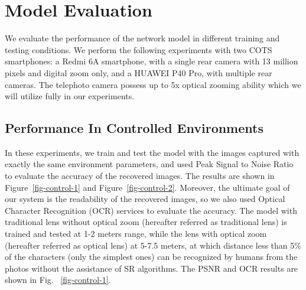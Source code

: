 \section{Model Evaluation}
\label{sec-evaluation}
We evaluate the performance of the network model in different training and testing conditions. We perform the following experiments with two COTS smartphones: a Redmi 6A smartphone, with a single rear camera with 13 million pixels and digital zoom only, and a HUAWEI P40 Pro, with multiple rear cameras. The telephoto camera possess up to 5x optical zooming ability which we will utilize fully in our experiments.
 
\subsection{Performance In Controlled Environments}
In these experiments, we train and test the model with the images captured with exactly the same environment parameters, and used Peak Signal to Noise Ratio to evaluate the accuracy of the recovered images. The results are shown in Figure~\ref{fig-control-1} and Figure~\ref{fig-control-2}. Moreover, the ultimate goal of our system is the readability of the recovered images, so we also used Optical Character Recognition (OCR) services to evaluate the accuracy. The model with traditional lens without optical zoom (hereafter referred as traditional lens) is trained and tested at 1-2 meters range, while the lens with optical zoom (hereafter referred as optical lens) at 5-7.5 meters, at which distance less than 5\% of the characters (only the simplest ones) can be recognized by humans from the photos without the assistance of SR algorithms. The PSNR and OCR results are shown in Fig. ~\ref{fig-control-1}.

